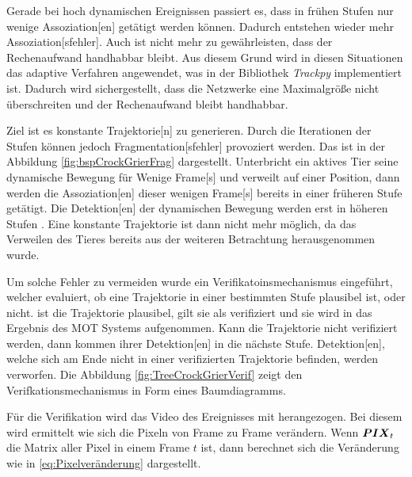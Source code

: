 
Gerade bei hoch dynamischen Ereignissen passiert es, dass in frühen Stufen nur wenige \gls{Assoziation}[en] getätigt werden können. Dadurch entstehen wieder mehr \gls{Assoziation}[sfehler]. Auch ist nicht mehr zu gewährleisten, dass der Rechenaufwand handhabbar bleibt. Aus diesem Grund wird in diesen Situationen das adaptive Verfahren angewendet, was in der \gls{Bibliothek} \textit{Trackpy} \cite{Allan.2023} implementiert ist. Dadurch wird sichergestellt, dass die Netzwerke eine Maximalgröße nicht überschreiten und der Rechenaufwand bleibt handhabbar. \par

Ziel ist es konstante \gls{Trajektorie}[n] zu generieren. Durch die Iterationen der Stufen können jedoch \gls{Fragmentation}[sfehler] provoziert werden. Das ist in der Abbildung \ref{fig:bspCrockGrierFrag} dargestellt. Unterbricht ein aktives Tier seine dynamische Bewegung für Wenige \gls{Frame}[s] und verweilt auf einer Position, dann werden die \gls{Assoziation}[en] dieser wenigen \gls{Frame}[s] bereits in einer früheren Stufe getätigt. Die \gls{Detektion}[en] der dynamischen Bewegung werden erst in höheren Stufen . Eine konstante \gls{Trajektorie} ist dann nicht mehr möglich, da das Verweilen des Tieres bereits aus der weiteren Betrachtung herausgenommen wurde. 


Um solche Fehler zu vermeiden wurde ein Verifikatoinsmechanismus eingeführt, welcher evaluiert, ob eine \gls{Trajektorie} in einer bestimmten Stufe plausibel ist, oder nicht. ist die \gls{Trajektorie} plausibel, gilt sie als verifiziert und sie wird in das Ergebnis des \gls{MOT} Systems aufgenommen. Kann die \gls{Trajektorie} nicht verifiziert werden, dann kommen ihrer \gls{Detektion}[en] in die nächste Stufe. \gls{Detektion}[en], welche sich am Ende nicht in einer verifizierten \gls{Trajektorie} befinden, werden verworfen. Die Abbildung \ref{fig:TreeCrockGrierVerif} zeigt den Verifkationsmechanismus in Form eines Baumdiagramms. 


Für die Verifikation wird das Video des Ereignisses mit herangezogen. Bei diesem wird ermittelt wie sich die Pixeln von \gls{Frame} zu \gls{Frame} verändern. Wenn \(\boldsymbol{PIX}_t\) die Matrix aller Pixel in einem \gls{Frame} \(t\) ist, dann berechnet sich die Veränderung wie in \ref{eq:Pixelveränderung} dargestellt.

